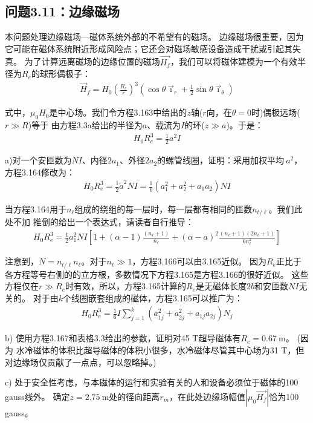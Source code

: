 \subsection{问题3.11：边缘磁场}
本问题处理边缘磁场---磁体系统外部的不希望有的磁场。
边缘磁场很重要，因为它可能在磁体系统附近形成风险点；它还会对磁场敏感设备造成干扰或引起其失真。
为了计算远离磁场的边缘位置的磁场$\vec{H_f}$，我们可以将磁体建模为一个有效半径为$R_e$的球形偶极子：
\begin{align}
\vec{H}_{f}=H_{0}(\frac{R_{e}}{r})^{3}(\cos\theta\vec{\imath}_{r}+\frac{1}{2}\sin\theta\vec{\imath}_{\theta})
\end{align}

式中，$\mu_0 H_0$是中心场。我们令方程3.163中给出的$z$轴($r$向，在$\theta=0$时)偶极远场($r\gg R$)等于
由方程3.3a给出的半径为$a$、载流为$I$的环($z\gg a$)。于是：
\begin{align}
H_{0}R_{e}^{3}=\frac{1}{2}a^{2}I
\end{align}

a)对一个安匝数为$NI$、内径$2a_1$、外径$2a_2$的螺管线圈，证明：采用加权平均$~{a}^2$，方程3.164修改为：
\begin{align}
H_{0}R_{e}^{3}=\frac{1}{2}\tilde{a}^{2}NI=\frac{1}{6}(a_{1}^{2}+a_{2}^{2}+a_{1}a_{2})NI
\end{align}

当方程3.164用于$n_{\ell}$组成的绕组的每一层时，每一层都有相同的匝数$n_{t/\ell}$。我们此处不加
推倒的给出一个表达式，请读者自行推导：
\begin{align}
H_{0}R_{e}^{3}=\frac{1}{2}a_{1}^{2}NI[1+(\alpha-1)\frac{(n_{\ell}+1)}{n_{\ell}}+(\alpha-a)^{2}\frac{(n_{\ell}+1)(2n_{\ell}+1)}{6n_{\ell}^{2}}]
\end{align}

注意到，$N=n_{t/\ell} n_{\ell}$。对于$n_{\ell}\gg1$，方程3.166可以由3.165近似。
因为$R_e$正比于各方程等号右侧的的立方根，多数情况下方程3.165是方程3.166的很好近似。
这些方程仅在$r\gg R_e$时有效，所以，方程3.165计算的$R_e$是无磁体长度$2b$和安匝数$NI$无关的。
对于由$k$个线圈嵌套组成的磁体，方程3.165可以推广为：
\begin{align}
H_{0}R_{e}^{3}=\frac{1}{6}I\sum_{j=1}^{k}(a_{1j}^{2}+a_{2j}^{2}+a_{1j}a_{2j})N_{j}
\end{align}

b) 使用方程3.167和表格3.3给出的参数，证明对45 T超导磁体有$R_e=0.67 \ \mathrm{m} $。 (因为
水冷磁体的体积比超导磁体的体积小很多，水冷磁体尽管其中心场为31 T，但对边缘场仅贡献了一点点，可以忽略掉。)

c) 处于安全性考虑，与本磁体的运行和实验有关的人和设备必须位于磁体的100 gauss线外。
确定$z=2.75\ \mathrm{m}$处的径向距离$r_m$，在此处边缘场幅值$|\mu_0 \vec{H_f}|$恰为100 gauss。

